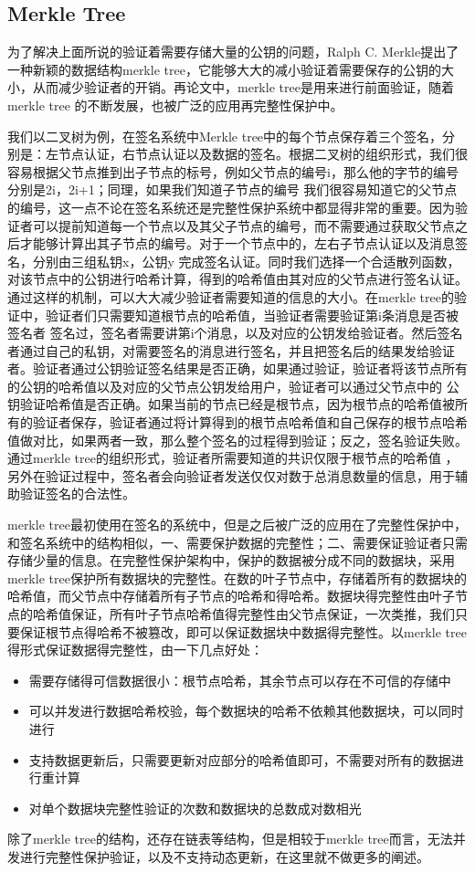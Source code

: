 \subsection{Merkle Tree}
为了解决上面所说的验证着需要存储大量的公钥的问题，Ralph C. Merkle提出了一种新颖的数据结构merkle tree，它能够大大的减小验证着需要保存的公钥的大小，从而减少验证者的开销。再论文中，merkle tree是用来进行前面验证，随着merkle tree
的不断发展，也被广泛的应用再完整性保护中。

我们以二叉树为例，在签名系统中Merkle tree中的每个节点保存着三个签名，分别是：左节点认证，右节点认证以及数据的签名。根据二叉树的组织形式，我们很容易根据父节点推到出子节点的标号，例如父节点的编号i，那么他的字节的编号分别是2i，2i+1；同理，如果我们知道子节点的编号
我们很容易知道它的父节点的编号，这一点不论在签名系统还是完整性保护系统中都显得非常的重要。因为验证者可以提前知道每一个节点以及其父子节点的编号，而不需要通过获取父节点之后才能够计算出其子节点的编号。对于一个节点中的，左右子节点认证以及消息签名，分别由三组私钥x，公钥y
完成签名认证。同时我们选择一个合适散列函数，对该节点中的公钥进行哈希计算，得到的哈希值由其对应的父节点进行签名认证。通过这样的机制，可以大大减少验证者需要知道的信息的大小。在merkle tree的验证中，验证者们只需要知道根节点的哈希值，当验证者需要验证第i条消息是否被签名者
签名过，签名者需要讲第i个消息，以及对应的公钥发给验证者。然后签名者通过自己的私钥，对需要签名的消息进行签名，并且把签名后的结果发给验证者。验证者通过公钥验证签名结果是否正确，如果通过验证，验证者将该节点所有的公钥的哈希值以及对应的父节点公钥发给用户，验证者可以通过父节点中的
公钥验证哈希值是否正确。如果当前的节点已经是根节点，因为根节点的哈希值被所有的验证者保存，验证者通过将计算得到的根节点哈希值和自己保存的根节点哈希值做对比，如果两者一致，那么整个签名的过程得到验证；反之，签名验证失败。通过merkle tree的组织形式，验证者所需要知道的共识仅限于根节点的哈希值
，另外在验证过程中，签名者会向验证者发送仅仅对数于总消息数量的信息，用于辅助验证签名的合法性。

merkle tree最初使用在签名的系统中，但是之后被广泛的应用在了完整性保护中，和签名系统中的结构相似，一、需要保护数据的完整性；二、需要保证验证者只需存储少量的信息。在完整性保护架构中，保护的数据被分成不同的数据块，采用merkle tree保护所有数据块的完整性。在数的叶子节点中，存储着所有的数据块的
哈希值，而父节点中存储着所有子节点的哈希和得哈希。数据块得完整性由叶子节点的哈希值保证，所有叶子节点哈希值得完整性由父节点保证，一次类推，我们只要保证根节点得哈希不被篡改，即可以保证数据块中数据得完整性。以merkle tree得形式保证数据得完整性，由一下几点好处：
\begin{itemize}
    \item 需要存储得可信数据很小：根节点哈希，其余节点可以存在不可信的存储中
    \item 可以并发进行数据哈希校验，每个数据块的哈希不依赖其他数据块，可以同时进行
    \item 支持数据更新后，只需要更新对应部分的哈希值即可，不需要对所有的数据进行重计算
    \item 对单个数据块完整性验证的次数和数据块的总数成对数相光
\end{itemize}
除了merkle tree的结构，还存在链表等结构，但是相较于merkle tree而言，无法并发进行完整性保护验证，以及不支持动态更新，在这里就不做更多的阐述。